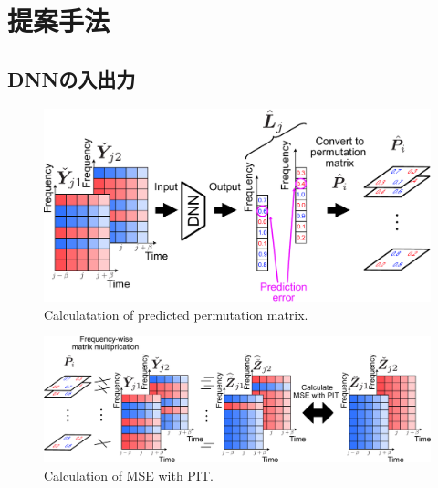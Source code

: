 \documentclass[a4j]{jsarticle}
\begin{document}
\section{提案手法}
\subsection{DNNの入出力}
\begin{figure}[t]
  \begin{center}
      \includegraphics[width=1.00\columnwidth]{figures/cal_loss1.pdf}
  \end{center}
  \vspace{-8pt}
\caption{Calculatation of predicted permutation matrix.}
\label{fig:cal_loss1}
\vspace{-18pt}
\end{figure}
\begin{figure}[t]
  \begin{center}
      \includegraphics[width=2.0\columnwidth]{figures/cal_loss2.pdf}
  \end{center}
  \vspace{-8pt}
\caption{Calculation of MSE with PIT.}
\label{fig:cal_loss2}
\end{figure}
\end{document}
